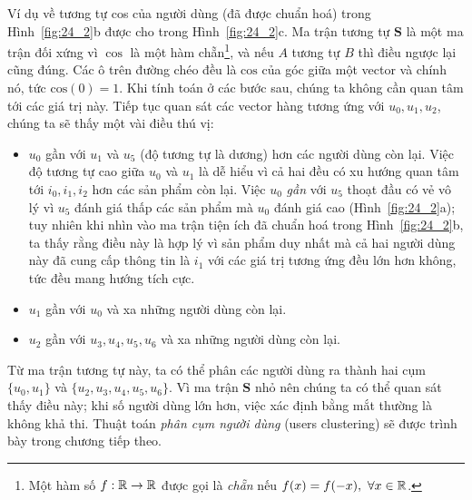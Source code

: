 Ví dụ về tương tự cos của người dùng (đã được chuẩn
hoá) trong Hình~\ref{fig:24_2}b được cho trong Hình~\ref{fig:24_2}c.
Ma trận tương tự $\mathbf{S}$ là
một ma trận đối xứng vì $\cos$ là một hàm chẵn\footnote{Một hàm số
$f:\mathbb{R}\rightarrow \mathbb{R}$ được gọi là \textit{chẵn} nếu $f(x) = f(-x),~\forall x \in
\mathbb{R}$.}, và nếu $A$ tương tự $B$ thì điều
ngược lại cũng đúng. Các ô trên đường chéo đều là
$\text{cos}$ của góc giữa một vector và chính nó, tức $\text{cos}(0) = 1$. Khi
tính toán ở các bước sau, chúng ta không cần quan tâm tới các giá trị này.
Tiếp tục quan sát các vector hàng tương ứng với $u_0, u_1, u_2$, chúng ta sẽ
thấy một vài điều thú vị:

\begin{itemize}
\item $u_0$ {gần} với $u_1$ và $u_5$ (độ tương tự là dương) hơn các
người dùng còn lại. Việc độ tương tự cao giữa $u_0$ và $u_1$ là
dễ hiểu vì cả hai đều có xu hướng quan tâm tới $i_0, i_1, i_2$ hơn các
sản phẩm còn lại. Việc $u_0$ \textit{gần} với $u_5$ thoạt đầu có vẻ vô
lý vì $u_5$ đánh giá thấp các sản phẩm mà $u_0$ đánh giá cao
(Hình~\ref{fig:24_2}a); tuy nhiên khi nhìn vào ma trận tiện ích đã chuẩn hoá
trong Hình~\ref{fig:24_2}b, ta thấy rằng điều này là hợp lý vì sản phẩm duy
nhất mà cả hai người dùng này đã cung cấp thông tin là $i_1$ với các giá
trị tương ứng đều lớn hơn không, tức đều mang hướng tích cực.

\item $u_1$ gần với $u_0$ và xa những người dùng còn lại.

\item $u_2$ gần với $u_3, u_4, u_5, u_6$ và xa những người dùng còn lại.
\end{itemize}

Từ ma trận tương tự này, ta có thể phân các người dùng ra thành hai cụm $\{u_0,
u_1\}$ và $\{u_2, u_3, u_4, u_5, u_6\}$. Vì ma trận $\mathbf{S}$ nhỏ nên chúng ta
có thể quan sát thấy điều này; khi số người dùng lớn hơn, việc xác định bằng mắt
thường là không khả thi. Thuật toán \textit{phân cụm người dùng} ({users
clustering}) sẽ được trình bày trong chương tiếp theo.



